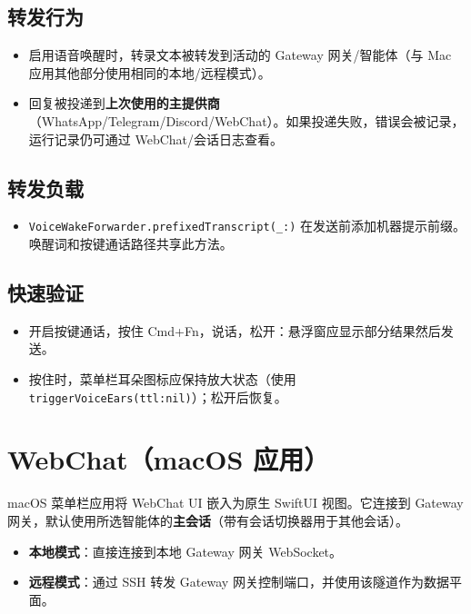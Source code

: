 \subsection{转发行为}


\begin{itemize}
  \item 启用语音唤醒时，转录文本被转发到活动的 Gateway 网关/智能体（与 Mac 应用其他部分使用相同的本地/远程模式）。
  \item 回复被投递到\textbf{上次使用的主提供商}（WhatsApp/Telegram/Discord/WebChat）。如果投递失败，错误会被记录，运行记录仍可通过 WebChat/会话日志查看。
\end{itemize}


\subsection{转发负载}


\begin{itemize}
  \item \texttt{VoiceWakeForwarder.prefixedTranscript(\_:)} 在发送前添加机器提示前缀。唤醒词和按键通话路径共享此方法。
\end{itemize}


\subsection{快速验证}


\begin{itemize}
  \item 开启按键通话，按住 Cmd+Fn，说话，松开：悬浮窗应显示部分结果然后发送。
  \item 按住时，菜单栏耳朵图标应保持放大状态（使用 \texttt{triggerVoiceEars(ttl:nil)}）；松开后恢复。
\end{itemize}



\clearpage

\section{WebChat（macOS 应用）}


macOS 菜单栏应用将 WebChat UI 嵌入为原生 SwiftUI 视图。它连接到 Gateway 网关，默认使用所选智能体的\textbf{主会话}（带有会话切换器用于其他会话）。

\begin{itemize}
  \item \textbf{本地模式}：直接连接到本地 Gateway 网关 WebSocket。
  \item \textbf{远程模式}：通过 SSH 转发 Gateway 网关控制端口，并使用该隧道作为数据平面。
\end{itemize}


